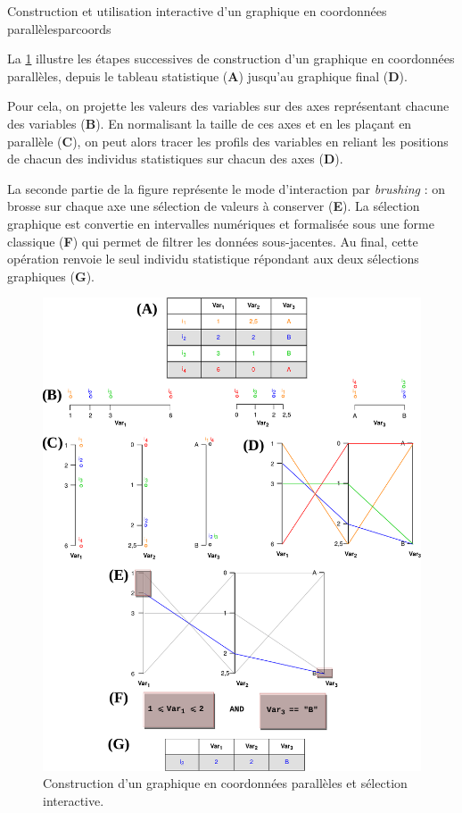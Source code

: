 \begin{encadre}{Construction et utilisation interactive d'un graphique en coordonnées parallèles}{parcoords}
	
	La \cref{fig:schema_parcoords} illustre les étapes successives de construction d'un graphique en coordonnées parallèles, depuis le tableau statistique (\textbf{A}) jusqu'au graphique final (\textbf{D}).
	
	Pour cela, on projette les valeurs des variables sur des axes représentant chacune des variables (\textbf{B}).
	En normalisant la taille de ces axes et en les plaçant en parallèle (\textbf{C}), on peut alors tracer les \og profils\fg{} des variables en reliant les positions de chacun des individus statistiques sur chacun des axes (\textbf{D}).
	
	La seconde partie de la figure représente le mode d'interaction par \textit{brushing} : on \og brosse\fg{} sur chaque axe une sélection de valeurs à conserver (\textbf{E}).
	La sélection graphique est convertie en intervalles numériques et formalisée sous une forme classique (\textbf{F}) qui permet de filtrer les données sous-jacentes.
	Au final, cette opération renvoie le seul individu statistique répondant aux deux sélections graphiques (\textbf{G}).
	
	\begin{figure}[H]
		\centering
		\captionsetup{width=\linewidth}
		\includegraphics[width=.94\linewidth]{img/ParCoords_Brush.pdf}
		\caption{Construction d'un graphique en coordonnées parallèles et sélection interactive.\vspace{.1cm}}
		\label{fig:schema_parcoords}
	\end{figure}
	\medskip
\end{encadre}

